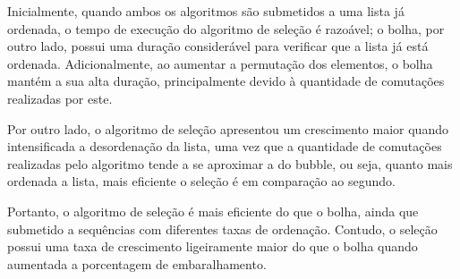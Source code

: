 Inicialmente, quando ambos os algoritmos são submetidos a uma lista já ordenada, o tempo de execução do algoritmo de seleção é razoável; o bolha, por outro lado, possui uma duração considerável para verificar que a lista já está ordenada. Adicionalmente, ao aumentar a permutação dos elementos, o bolha mantém a sua alta duração, principalmente devido à quantidade de comutações realizadas por este.

Por outro lado, o algoritmo de seleção apresentou um crescimento maior quando intensificada a desordenação da lista, uma vez que a quantidade de comutações realizadas pelo algoritmo tende a se aproximar a do bubble, ou seja, quanto mais ordenada a lista, mais eficiente o seleção é em comparação ao segundo.

Portanto, o algoritmo de seleção é mais eficiente do que o bolha, ainda que submetido a sequências com diferentes taxas de ordenação. Contudo, o seleção possui uma taxa de crescimento ligeiramente maior do que o bolha quando aumentada a porcentagem de embaralhamento.
